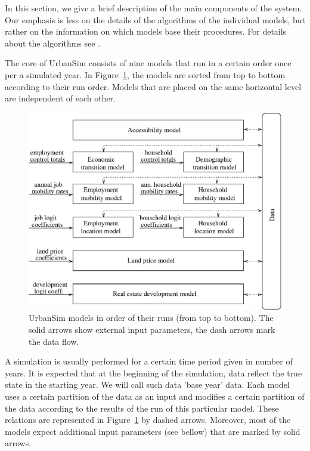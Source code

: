 \documentclass[11pt, fleqn]{article}
\begin{document}
In this section, we give a brief description of the main components of the
system. Our emphasis is less on the details of the algorithms of the
individual models, but rather on the information on which models base their
procedures.  For details about the algorithms see \citet{waddell03}.

The core of UrbanSim consists of nine models that run in a certain order once
per a simulated year. In Figure~\ref{fig:urbansim}, the models are sorted
from top to bottom according to their run order. Models that are placed on
the same horizontal level are independent of each other. 


\begin{figure}[t]
\begin{center}
\includegraphics[scale=0.8]{pic/UrbanSim.eps}
\caption{\label{fig:urbansim}\small UrbanSim models in order of their runs
  (from top to bottom). The solid arrows show external input parameters, the
  dash arrows mark the data flow.}
\end{center}
\end{figure}



A simulation is usually performed for a certain time period given in number of
years. It is expected that at the beginning of the simulation, data reflect
the true state in the starting year. We will call such data 'base year' data.
Each model uses a certain partition of the data as an input and modifies a
certain partition of the data according to the results of the run of this
particular model. These relations are represented in Figure~\ref{fig:urbansim}
by dashed arrows. Moreover, most of the models expect additional input
parameters (see bellow) that are marked by solid arrows.
\end{document}
